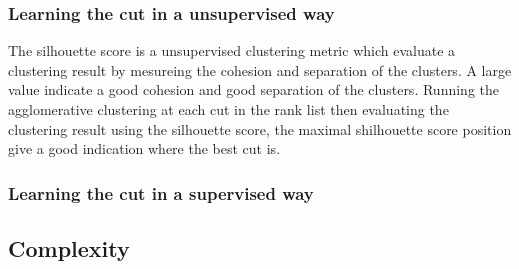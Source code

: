 \subsubsection{Learning the cut in a unsupervised way}

The silhouette score is a unsupervised clustering metric which evaluate a clustering result by mesureing the cohesion and separation of the clusters.
A large value indicate a good cohesion and good separation of the clusters.
Running the agglomerative clustering at each cut in the rank list then evaluating the clustering result using the silhouette score, the maximal shilhouette score position give a good indication where the best cut is.

\subsubsection{Learning the cut in a supervised way}



\subsection{Complexity}
